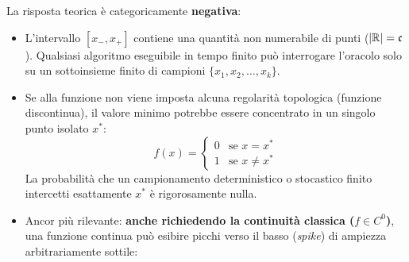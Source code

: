 La risposta teorica \`e categoricamente \textbf{negativa}:
\begin{itemize}
    \item L'intervallo $[x_-, x_+]$ contiene una quantit\`a non numerabile di punti ($|\mathbb{R}| = \mathfrak{c}$). Qualsiasi algoritmo eseguibile in tempo finito pu\`o interrogare l'oracolo solo su un sottoinsieme finito di campioni $\{x_1, x_2, \dots, x_k\}$.
    \item Se alla funzione non viene imposta alcuna regolarit\`a topologica (funzione discontinua), il valore minimo potrebbe essere concentrato in un singolo punto isolato $x^*$:
    \begin{equation}
        f(x) = \begin{cases} 0 & \text{se } x = x^* \\ 1 & \text{se } x \neq x^* \end{cases}
    \end{equation}
    La probabilit\`a che un campionamento deterministico o stocastico finito intercetti esattamente $x^*$ \`e rigorosamente nulla.
    \item Ancor pi\`u rilevante: \textbf{anche richiedendo la continuit\`a classica ($f \in C^0$)}, una funzione continua pu\`o esibire picchi verso il basso (\textit{spike}) di ampiezza arbitrariamente sottile:
\end{itemize}

